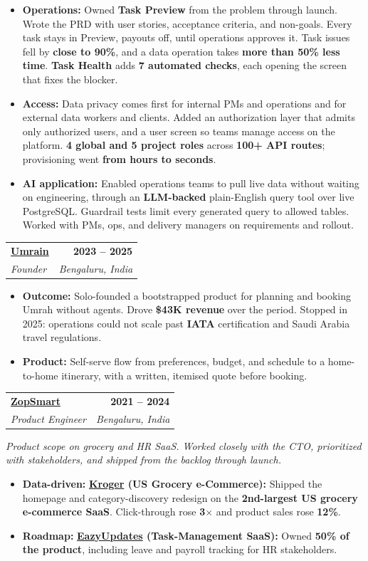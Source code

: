 \documentclass[letterpaper,10.5pt]{article}
\makeatletter
\newcommand{\entry}[4]{%
  \begin{tabularx}{\linewidth}{@{}X@{}r@{}}
    \textbf{#1} & \textbf{#4} \\
    \textit{#2} & \textit{#3} \\
  \end{tabularx}%
  \vspace{1pt}
}
\makeatother
\begin{document}
\begin{itemize}
  \item \textbf{Operations:} Owned \textbf{Task Preview} from the problem through launch. Wrote the PRD with user stories, acceptance criteria, and non-goals. Every task stays in Preview, payouts off, until operations approves it. Task issues fell by \textbf{close to 90\%}, and a data operation takes \textbf{more than 50\% less time}. \textbf{Task Health} adds \textbf{7 automated checks}, each opening the screen that fixes the blocker.
  \item \textbf{Access:} Data privacy comes first for internal PMs and operations and for external data workers and clients. Added an authorization layer that admits only authorized users, and a user screen so teams manage access on the platform. \textbf{4 global and 5 project roles} across \textbf{100+ API routes}; provisioning went \textbf{from hours to seconds}.
  \item \textbf{AI application:} Enabled operations teams to pull live data without waiting on engineering, through an \textbf{LLM-backed} plain-English query tool over live PostgreSQL. Guardrail tests limit every generated query to allowed tables. Worked with PMs, ops, and delivery managers on requirements and rollout.
\end{itemize}

\entry{\href{https://umrain.in}{Umrain}}{Founder}{Bengaluru, India}{2023 -- 2025}
\begin{itemize}
  \item \textbf{Outcome:} Solo-founded a bootstrapped product for planning and booking Umrah without agents. Drove \textbf{\$43K revenue} over the period. Stopped in 2025: operations could not scale past \textbf{IATA} certification and Saudi Arabia travel regulations.
  \item \textbf{Product:} Self-serve flow from preferences, budget, and schedule to a home-to-home itinerary, with a written, itemised quote before booking.
\end{itemize}

\entry{\href{https://zopsmart.com}{ZopSmart}}{Product Engineer}{Bengaluru, India}{2021 -- 2024}
{\small\textit{Product scope on grocery and HR SaaS. Worked closely with the CTO, prioritized with stakeholders, and shipped from the backlog through launch.}}
\begin{itemize}
  \item \textbf{Data-driven:} \textbf{\href{https://www.kroger.com}{Kroger} (US Grocery e-Commerce):} Shipped the homepage and category-discovery redesign on the \textbf{2nd-largest US grocery e-commerce SaaS}. Click-through rose \textbf{3$\times$} and product sales rose \textbf{12\%}.
  \item \textbf{Roadmap:} \textbf{\href{https://eazyupdates.com}{EazyUpdates} (Task-Management SaaS):} Owned \textbf{50\% of the product}, including leave and payroll tracking for HR stakeholders.
\end{itemize}
\end{document}
